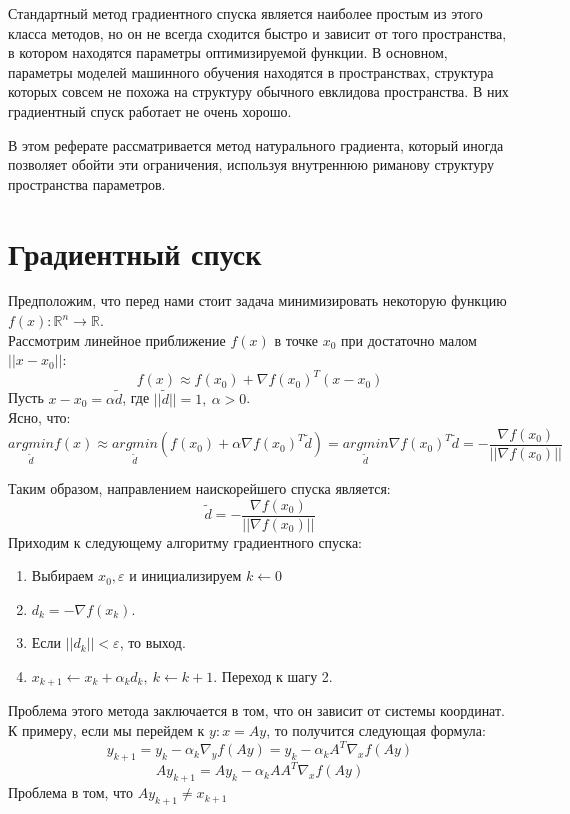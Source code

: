 \documentclass[a4paper,12pt]{article}
\begin{document}
Стандартный метод градиентного спуска является наиболее простым из этого класса методов, но
он не всегда сходится быстро и зависит от того пространства, в котором находятся параметры
оптимизируемой функции. В основном, параметры моделей машинного обучения находятся в пространствах, структура которых совсем не
похожа на структуру обычного евклидова пространства. В них градиентный спуск работает не очень хорошо.

В этом реферате рассматривается метод натурального градиента, который иногда 
позволяет обойти эти ограничения, используя внутреннюю риманову структуру пространства параметров. 

\newpage 

\section{Градиентный спуск}
Предположим, что перед нами стоит задача минимизировать некоторую функцию $f(x) : \mathbb{R}^{n} \rightarrow \mathbb{R}$. \\
Рассмотрим линейное приближение $f(x)$ в точке $x_0$ при достаточно малом $||x - x_0||$:
$$f(x) \approx f(x_0) + \nabla{f(x_0)}^{T}(x - x_0)$$
Пусть $x - x_0 = \alpha \widetilde{d} $, где $||\widetilde{d}|| = 1, ~ \alpha > 0$.  \\ 
Ясно, что:
$$\underset{\widetilde{d}}{argmin} f(x) \approx 
\underset{\widetilde{d}}{argmin} (f(x_0) + \alpha \nabla{f(x_0)}^{T}\widetilde{d}) = 
\underset{\widetilde{d}}{argmin} \nabla{f(x_0)}^{T}\widetilde{d} = 
-\frac{\nabla{f(x_0)}}{||\nabla{f(x_0)}||}$$

\noindent Таким образом, направлением наискорейшего спуска является:
$$\widetilde{d} = -\frac{\nabla{f(x_0)}}{||\nabla{f(x_0)}||}$$
Приходим к следующему алгоритму градиентного спуска:
\begin{enumerate}
    \item Выбираем $x_0, \varepsilon $ и инициализируем $k \leftarrow 0$
    \item $d_k = -\nabla{f(x_k)}$.
    \item Если $||d_k|| < \varepsilon$, то выход.
    \item $x_{k+1} \leftarrow x_{k} + \alpha_k d_k, ~ k \leftarrow k + 1$. Переход к шагу 2. 
\end{enumerate}

Проблема этого метода заключается в том, что он зависит от системы координат. К примеру, если
мы перейдем к $y: x = Ay$, то получится следующая формула: \\
$$y_{k+1} = y_{k} - \alpha_k \nabla_y{f(Ay)} = y_{k} - \alpha_k A^T \nabla_x{f(Ay)}$$
$$Ay_{k+1} = Ay_{k} - \alpha_k AA^T \nabla_x{f(Ay)}$$
Проблема в том, что $Ay_{k+1} \neq x_{k+1}$ \\
\end{document}
